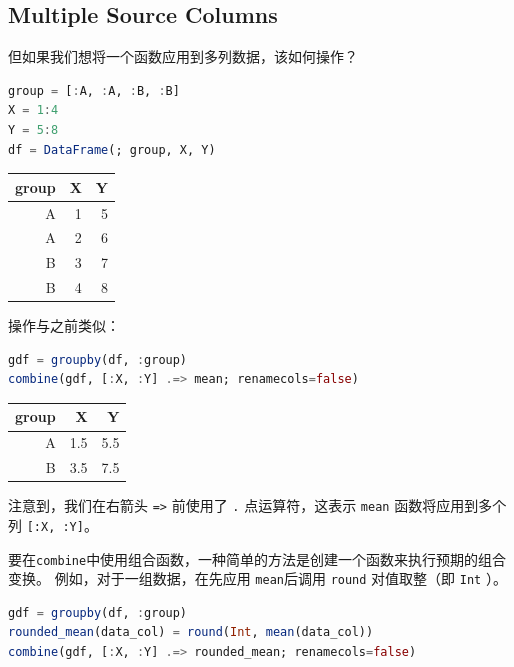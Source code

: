 \documentclass[
  notoc %
]{tufte-book}
\newcommand{\passthrough}[1]{#1}
\begin{document}
\hypertarget{sec:groupby_combine_multiple_source}{%
\subsection{Multiple Source
Columns}\label{sec:groupby_combine_multiple_source}}

但如果我们想将一个函数应用到多列数据，该如何操作？

\begin{lstlisting}[language=Julia]
group = [:A, :A, :B, :B]
X = 1:4
Y = 5:8
df = DataFrame(; group, X, Y)
\end{lstlisting}

\begin{longtable}[]{@{}rrr@{}}
\toprule
group & X & Y \\
\midrule
\endhead
A & 1 & 5 \\
A & 2 & 6 \\
B & 3 & 7 \\
B & 4 & 8 \\
\bottomrule
\end{longtable}

操作与之前类似：

\begin{lstlisting}[language=Julia]
gdf = groupby(df, :group)
combine(gdf, [:X, :Y] .=> mean; renamecols=false)
\end{lstlisting}

\begin{longtable}[]{@{}rrr@{}}
\toprule
group & X & Y \\
\midrule
\endhead
A & 1.5 & 5.5 \\
B & 3.5 & 7.5 \\
\bottomrule
\end{longtable}

注意到，我们在右箭头 \passthrough{\lstinline!=>!} 前使用了
\passthrough{\lstinline!.!} 点运算符，这表示
\passthrough{\lstinline!mean!} 函数将应用到多个列
\passthrough{\lstinline![:X, :Y]!}。

要在\passthrough{\lstinline!combine!}中使用组合函数，一种简单的方法是创建一个函数来执行预期的组合变换。
例如，对于一组数据，在先应用 \passthrough{\lstinline!mean!}后调用
\passthrough{\lstinline!round!} 对值取整（即
\passthrough{\lstinline!Int!} ）。

\begin{lstlisting}[language=Julia]
gdf = groupby(df, :group)
rounded_mean(data_col) = round(Int, mean(data_col))
combine(gdf, [:X, :Y] .=> rounded_mean; renamecols=false)
\end{lstlisting}
\end{document}
